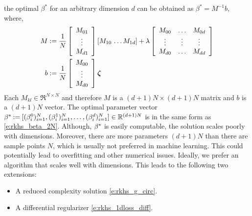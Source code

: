 the optimal $\beta^*$ for an arbitrary dimension $d$ can be obtained as $\beta^* = M^{-1}b$, where,
\begin{equation}
\begin{aligned}
M & := \frac{1}{N} \left[\begin{array}{c} M_{01} \\ \vdots \\ M_{d1} \end{array}\right] [ M_{10} \, \hdots M_{1d}] + \lambda  \left[
\begin{array}{c c c}
M_{00}  & \hdots & M_{0d}\\
\vdots & \vdots &  \vdots \\
M_{d0} & \hdots & M_{dd}
\end{array}
\right] \\
b & :=  \frac{1}{N} \left[ \begin{array}{c} M_{00} \\ \vdots \\ M_{d0} \end{array}\right] \boldsymbol{\zeta}
\end{aligned}
\label{e:rkhs_beta_optimal_d}
\end{equation}
Each $M_{kl} \in \Re^{N \times N}$ and therefore $M$ is a $(d+1) N \times (d+1) N$ matrix and $b$ is a $(d+1) N$ vector. The optimal parameter vector $\beta^* \mathbin{:=} [ (\beta^0_i)_{i=1}^N, (\beta^1_i)_{i=1}^N, \hdots, (\beta^d_i)_{i=1}^N] \in \mathbb{R}^{(d+1) N}$ is in the same form as \eqref{e:rkhs_beta_2N}. Although, $\beta^*$ is easily computable, the solution scales poorly with dimensions. 
Moreover, there are more parameters $(d+1)N$ than there are sample points $N$, which is usually not preferred in machine learning. This could potentially lead to overfitting and other numerical issues.   
Ideally, we prefer an algorithm that scales well with dimensions. This leads to the following two extensions:
\begin{itemize}
	\item A reduced complexity solution \eqref{e:rkhs_g_circ}.
	\item A differential regularizer \eqref{e:rkhs_1dloss_diff}.
\end{itemize}
